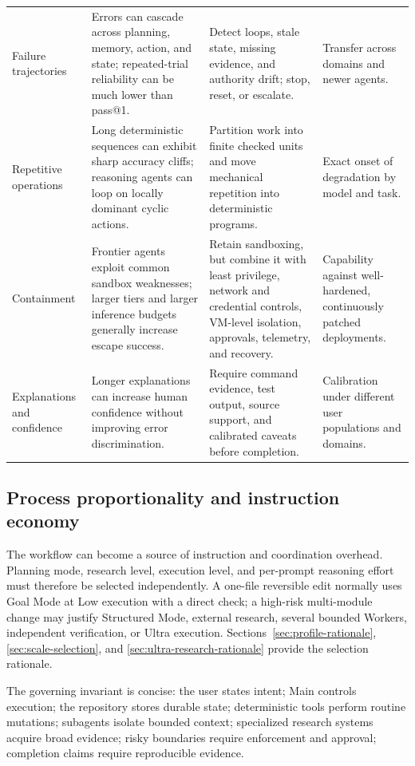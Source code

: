 \documentclass[11pt,a4paper]{article}
\begin{document}
\begin{longtable}{P{0.20\textwidth}P{0.29\textwidth}P{0.29\textwidth}P{0.14\textwidth}}
Failure trajectories & Errors can cascade across planning, memory, action, and state; repeated-trial reliability can be much lower than pass@1. & Detect loops, stale state, missing evidence, and authority drift; stop, reset, or escalate. & Transfer across domains and newer agents. \\
Repetitive operations & Long deterministic sequences can exhibit sharp accuracy cliffs; reasoning agents can loop on locally dominant cyclic actions. & Partition work into finite checked units and move mechanical repetition into deterministic programs. & Exact onset of degradation by model and task. \\
Containment & Frontier agents exploit common sandbox weaknesses; larger tiers and larger inference budgets generally increase escape success. & Retain sandboxing, but combine it with least privilege, network and credential controls, VM-level isolation, approvals, telemetry, and recovery. & Capability against well-hardened, continuously patched deployments. \\
Explanations and confidence & Longer explanations can increase human confidence without improving error discrimination. & Require command evidence, test output, source support, and calibrated caveats before completion. & Calibration under different user populations and domains. \\
\bottomrule
\end{longtable}
\endgroup

\subsection{Process proportionality and instruction economy}\label{sec:process-proportionality}

The workflow can become a source of instruction and coordination overhead. Planning mode, research level, execution level, and per-prompt reasoning effort must therefore be selected independently. A one-file reversible edit normally uses Goal Mode at Low execution with a direct check; a high-risk multi-module change may justify Structured Mode, external research, several bounded Workers, independent verification, or Ultra execution. Sections~\ref{sec:profile-rationale}, \ref{sec:scale-selection}, and \ref{sec:ultra-research-rationale} provide the selection rationale.

The governing invariant is concise: the user states intent; Main controls execution; the repository stores durable state; deterministic tools perform routine mutations; subagents isolate bounded context; specialized research systems acquire broad evidence; risky boundaries require enforcement and approval; completion claims require reproducible evidence.
\end{document}
